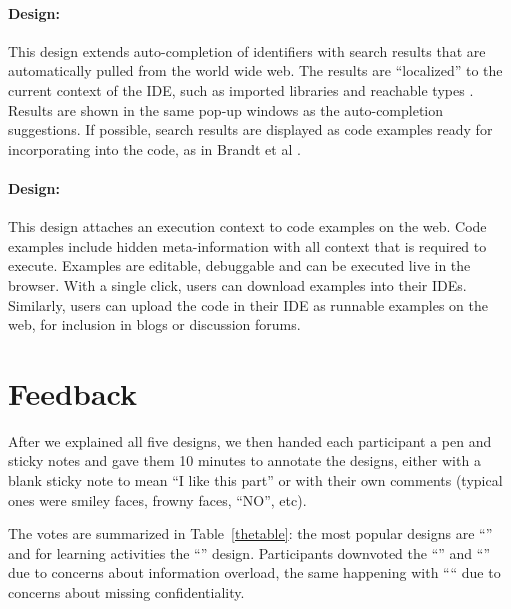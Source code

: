 \moarsauce
\paragraph{Design: \RichIntellisense} 
This design extends auto-completion of identifiers with search results that are automatically pulled from the world wide web. The results are ``localized'' to the current context of the IDE, such as imported libraries and reachable types \cite{Holmes2005}. Results are shown in the same pop-up windows as the auto-completion suggestions. If possible, search results are displayed as code examples ready for incorporating into the code, as in Brandt et al \cite{bdwk10}.

\moarsauce
\paragraph{Design: \CloudREPL} 
This design attaches an execution context to code examples on the web. Code examples include hidden meta-information with all context that is required to execute. Examples are editable, debuggable and can be executed live in the browser. With a single click, users can download examples into their IDEs. Similarly, users can upload the code in their IDE as runnable examples on the web, for inclusion in blogs or discussion forums.

\moarsauce
\section{Feedback}

After we explained all five designs, we then handed each participant a pen and sticky notes and gave them 10 minutes to annotate the designs, either with a blank sticky note to mean ``I like this part'' or with their own comments (typical ones were smiley faces, frowny faces, ``NO'', etc). 

The votes are summarized in Table~\ref{thetable}: the most popular designs are ``\FacettedSearch'' and for learning activities the ``\ConceptMap'' design. Participants downvoted the ``\ZoomableUML'' and ``\RichIntellisense'' due to concerns about information overload, the same happening with ``\CloudREPL`` due to concerns about missing confidentiality.

